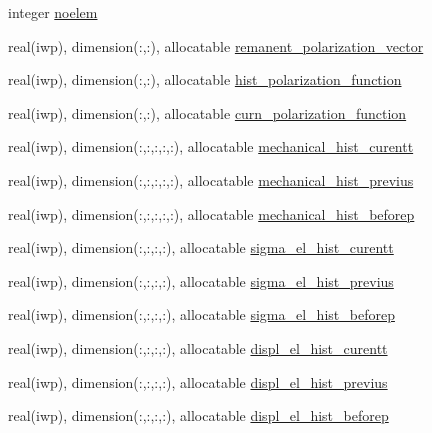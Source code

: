 \begin{DoxyCompactItemize}
\item 
integer \hyperlink{classmaterial__behavior_a5149a02e7e855d7d7379e213b8b54139}{noelem}
\item 
real(iwp), dimension(\+:,\+:), allocatable \hyperlink{classmaterial__behavior_a12dffbc2d241c20b84ecfbc0f7671da3}{remanent\+\_\+polarization\+\_\+vector}
\item 
real(iwp), dimension(\+:,\+:), allocatable \hyperlink{classmaterial__behavior_a292b2148c95dcd0530b28d6194f0e958}{hist\+\_\+polarization\+\_\+function}
\item 
real(iwp), dimension(\+:,\+:), allocatable \hyperlink{classmaterial__behavior_a8da5847f13b86fec4992e70561abade6}{curn\+\_\+polarization\+\_\+function}
\item 
real(iwp), dimension(\+:,\+:,\+:,\+:,\+:), allocatable \hyperlink{classmaterial__behavior_aaf2c43c6b05c402cd986502f7fe39514}{mechanical\+\_\+hist\+\_\+curentt}
\item 
real(iwp), dimension(\+:,\+:,\+:,\+:,\+:), allocatable \hyperlink{classmaterial__behavior_a187ecf1250fa732fcb1bb1c3695ed4b1}{mechanical\+\_\+hist\+\_\+previus}
\item 
real(iwp), dimension(\+:,\+:,\+:,\+:,\+:), allocatable \hyperlink{classmaterial__behavior_aebe24210c537401c01e43330ad9dd536}{mechanical\+\_\+hist\+\_\+beforep}
\item 
real(iwp), dimension(\+:,\+:,\+:,\+:), allocatable \hyperlink{classmaterial__behavior_a9395e93dd51a72249b887c2b1aa70cb9}{sigma\+\_\+el\+\_\+hist\+\_\+curentt}
\item 
real(iwp), dimension(\+:,\+:,\+:,\+:), allocatable \hyperlink{classmaterial__behavior_ad3264258813ff10e3c1f1ba6a633583b}{sigma\+\_\+el\+\_\+hist\+\_\+previus}
\item 
real(iwp), dimension(\+:,\+:,\+:,\+:), allocatable \hyperlink{classmaterial__behavior_a33ac63029fccc3bac68d829d695848cf}{sigma\+\_\+el\+\_\+hist\+\_\+beforep}
\item 
real(iwp), dimension(\+:,\+:,\+:,\+:), allocatable \hyperlink{classmaterial__behavior_abf8d440513a914e5f94a1d82de20d4ed}{displ\+\_\+el\+\_\+hist\+\_\+curentt}
\item 
real(iwp), dimension(\+:,\+:,\+:,\+:), allocatable \hyperlink{classmaterial__behavior_af359146083f70a15b20a14395fa383f6}{displ\+\_\+el\+\_\+hist\+\_\+previus}
\item 
real(iwp), dimension(\+:,\+:,\+:,\+:), allocatable \hyperlink{classmaterial__behavior_ab3e2b38e175ef5341037213c49d1d38e}{displ\+\_\+el\+\_\+hist\+\_\+beforep}
\item 

\end{DoxyCompactItemize}
